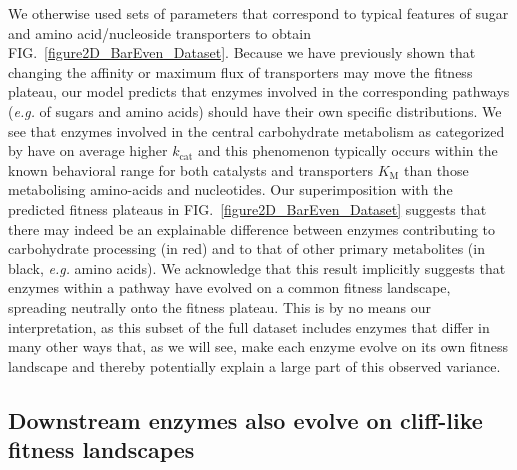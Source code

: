 \documentclass[11pt,onecolumn]{article}
\providecommand{\DIFadd}[1]{{\protect\color{blue} \sf #1}} %
\providecommand{\DIFdel}[1]{{\protect\color{red} \scriptsize #1}} %
\providecommand{\DIFaddbegin}{} %
\providecommand{\DIFaddend}{} %
\providecommand{\DIFdelbegin}{} %
\providecommand{\DIFdelend}{} %
\begin{document}
\DIFadd{We otherwise used sets of parameters that correspond to typical features of sugar and amino acid/nucleoside transporters to obtain FIG.~\ref{figure2D_BarEven_Dataset}. Because we have previously shown that changing the affinity or maximum flux of transporters may move the fitness plateau, our model predicts that enzymes involved in the corresponding pathways (\textit{e.g.} of sugars and amino acids) should have their own specific distributions. We see that enzymes involved in the central carbohydrate metabolism as categorized by \citet{Bar-Even11} have on average higher $k_\text{cat}$ }\DIFaddend and \DIFdelbegin \DIFdel{this phenomenon typically occurs within the known behavioral range for both catalysts and transporters}\DIFdelend \DIFaddbegin \DIFadd{$K_\text{M}$ than those metabolising amino-acids and nucleotides. Our superimposition with the predicted fitness plateaus in FIG.~\ref{figure2D_BarEven_Dataset} suggests that there may indeed be an explainable difference between enzymes contributing to carbohydrate processing (in red) and to that of other primary metabolites (in black, \textit{e.g.} amino acids).
We acknowledge that this result implicitly suggests that enzymes within a pathway have evolved on a common fitness landscape, spreading neutrally onto the fitness plateau. This is by no means our interpretation, as this subset of the full dataset includes enzymes that differ in many other ways that, as we will see, make each enzyme evolve on its own fitness landscape and thereby potentially explain a large part of this observed variance}\DIFaddend . 

\subsection{Downstream enzymes also evolve on cliff-like fitness landscapes}
\end{document}

